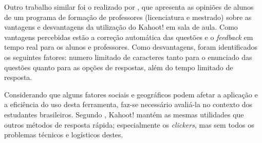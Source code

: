 Outro trabalho similar foi o realizado por , que apresenta as opiniões de alunos de um programa de formação de professores (licenciatura e mestrado) sobre as vantagens e desvantagens da utilização do Kahoot! em sala de aula. Como vantagens percebidas estão a correção automática das questões e o \textit{feedback} em tempo real para os alunos e professores. Como desvantagens, foram identificados os seguintes fatores: numero limitado de caracteres tanto para o enunciado das questões quanto para as opções de respostas, além do tempo limitado de resposta.

 Considerando que alguns fatores sociais e geográficos podem afetar a aplicação e a eficiência do uso desta ferramenta, faz-se necessário avaliá-la no contexto dos estudantes brasileiros. Segundo , Kahoot! mantém as mesmas utilidades que outros métodos de resposta rápida; especialmente os \textit{clickers}, mas sem todos os problemas técnicos e logísticos destes.

